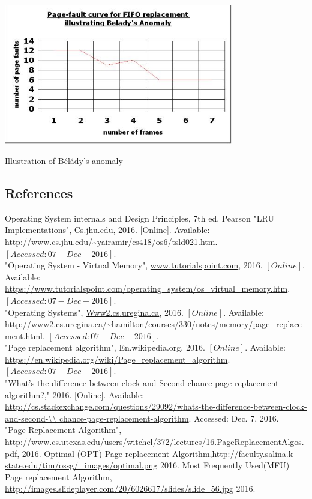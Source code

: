 \documentclass[12pt]{article}
\begin{document}
	\vspace{2cm}
	\includegraphics[width=10cm]{FIFO_Analysis.JPG}
	\begin{center}
		Illustration of  Bélády's anomaly
	\end{center}
	
	\pagebreak
	\begin{flushleft}
		\section{References}
		\begin{thebibliography}{10}
			
		 Operating System internals and Design Principles, 7th ed. Pearson
		"LRU Implementations", \url{Cs.jhu.edu}, 2016. [Online]. Available: \url{http://www.cs.jhu.edu/~yairamir/cs418/os6/tsld021.htm}. $[Accessed: 07- Dec- 2016].$\\
		 "Operating System - Virtual Memory", \url{www.tutorialspoint.com}, 2016. $[Online].$ Available: \url{https://www.tutorialspoint.com/operating_system/os_virtual_memory.htm}. $[Accessed: 07- Dec- 2016].$\\
		 "Operating Systems", \url{Www2.cs.uregina.ca}, 2016. $[Online]$. Available: \url{http://www2.cs.uregina.ca/~hamilton/courses/330/notes/memory/page_replacement.html}. $[Accessed: 07- Dec- 2016].$\\
		 "Page replacement algorithm", En.wikipedia.org, 2016. $[Online].$ Available: \url{https://en.wikipedia.org/wiki/Page_replacement_algorithm}. $[Accessed: 07- Dec- 2016]$.\\
		 "What’s the difference between clock and Second chance page-replacement algorithm?," 2016. [Online]. Available: \url{http://cs.stackexchange.com/questions/29092/whats-the-difference-between-clock-and-second-\\
			chance-page-replacement-algorithm}. Accessed: Dec. 7, 2016.\\
		"Page Replacement Algorithm", \url{http://www.cs.utexas.edu/users/witchel/372/lectures/16.PageReplacementAlgos.pdf}, 2016.
		 Optimal (OPT) Page replacement Algorithm,\url{http://faculty.salina.k-state.edu/tim/ossg/_images/optimal.png} 2016.
		Most Frequently Used(MFU) Page replacement Algorithm, \url{http://images.slideplayer.com/20/6026617/slides/slide_56.jpg} 2016.
			
		\end{thebibliography}
	\end{flushleft}
	
		
\end{document}
